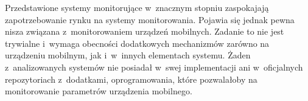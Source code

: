 Przedstawione systemy monitorujące w~znacznym stopniu zaspokajają
zapotrzebowanie rynku na systemy monitorowania. Pojawia się jednak
pewna nisza związana z~monitorowaniem urządzeń mobilnych. Zadanie to
nie jest trywialne i~wymaga obecności dodatkowych mechanizmów zarówno
na urządzeniu mobilnym, jak i~w~innych elementach systemu. Żaden
z~analizowanych systemów nie posiadał w~swej implementacji ani
w~oficjalnych repozytoriach z~dodatkami, oprogramowania, które
pozwalałoby na monitorowanie parametrów urządzenia mobilnego.

